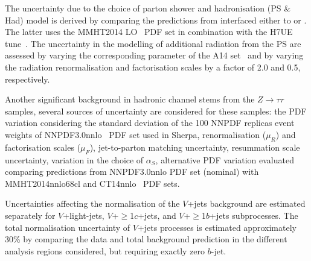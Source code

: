 \documentclass[PAPER, coverpage, atlasdraft=true, texlive=2016, UKenglish]{\ATLASLATEXPATH atlasdoc}
\providecommand{\DIFadd}[1]{{\protect\color{blue}\uwave{#1}}} %
\providecommand{\DIFaddbegin}{} %
\providecommand{\DIFaddend}{} %
\begin{document}
The uncertainty due to the choice of parton shower and hadronisation (PS \& Had) model is derived 
by comparing the predictions from {\powheg} interfaced either to {\pythiaeight} or {}.
The latter uses the MMHT2014 LO~\cite{Harland-Lang:2014zoa} PDF set in combination with the H7UE tune~\cite{Bellm:2015jjp}.
The uncertainty in the modelling of additional radiation from the PS are assessed by
varying the corresponding parameter of the A14 set~\cite{ATL-PHYS-PUB-2016-004} and by varying the radiation renormalisation and factorisation scales
by a factor of 2.0 and 0.5, respectively. 


Another significant background in hadronic channel stems from the $Z\rightarrow \tau\tau$ samples, several sources of uncertainty are
considered for these samples: the PDF variation considering the standard deviation of the 100 NNPDF replicas event weights
of NNPDF3.0nnlo~\cite{Ball:2015NNPDF} PDF
set used in Sherpa, renormalisation ($\mu_{R}$) and factorisation scales ($\mu_{F}$), jet-to-parton matching uncertainty, resummation scale uncertainty,
variation in the choice of $\alpha_{S}$, alternative PDF variation evaluated comparing predictions from NNPDF3.0nnlo PDF set (nominal)
with MMHT2014nnlo68cl and CT14nnlo~\cite{Lai:2010vv,Gao:2013xoa} PDF sets.

Uncertainties affecting the normalisation of the $V$+jets background are estimated separately for $V$+light-jets, $V$+$\geq$1$c$+jets,
and $V$+$\geq$1$b$+jets subprocesses. The total normalisation uncertainty of $V$+jets processes is estimated \DIFaddbegin \DIFadd{to be }\DIFaddend approximately 30\% by comparing the
data and total background prediction in the different analysis regions considered, but requiring exactly zero $b$-jet.
\end{document}
